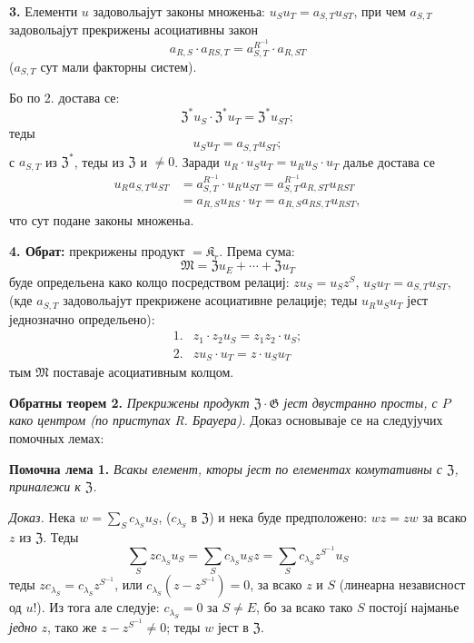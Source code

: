 \documentclass[11pt]{article}
\begin{document}
\noindent\textbf{3.} Елементи \(u\) задовольајут законы множеньа: \(u_Su_T=a_{S,T}u_{ST}\), при чем \(a_{S,T}\) задовольајут прекрижены асоциативны закон
\[
a_{R,S}\cdot a_{RS,T}=a_{S,T}^{R^{-1}}\cdot a_{R,ST}
\]
(\(a_{S,T}\) сут мали факторны систем).

Бо по 2. достава се:
\[
\mathfrak Z^*u_S\cdot\mathfrak Z^*u_T=\mathfrak Z^*u_{ST};
\]
теды
\[
u_Su_T=a_{S,T}u_{ST};
\]
с \(a_{S,T}\) из \(\mathfrak Z^*\), теды из \(\mathfrak Z\) и \(\neq0\). Заради \(u_R\cdot u_Su_T=u_Ru_S\cdot u_T\) далье достава се
\[
\begin{aligned}
u_Ra_{S,T}u_{ST}
&=a_{S,T}^{R^{-1}}\cdot u_Ru_{ST}
 =a_{S,T}^{R^{-1}}a_{R,ST}u_{RST}\\
&=a_{R,S}u_{RS}\cdot u_T
 =a_{R,S}a_{RS,T}u_{RST},
\end{aligned}
\]
что сут подане законы множеньа.

\noindent\textbf{4. Обрат:} прекрижены продукт \(=\mathfrak K_r\). Према сума:
\[
\mathfrak M=\mathfrak Zu_E+\cdots+\mathfrak Zu_T
\]
буде определьена како колцо посредством релациј: \(zu_S=u_Sz^S\), \(u_Su_T=a_{S,T}u_{ST}\), (кде \(a_{S,T}\) задовольајут прекрижене асоциативне релације; теды \(u_Ru_Su_T\) јест једнозначно определьено):
\[
\begin{array}{ll}
1.&z_1\cdot z_2u_S=z_1z_2\cdot u_S;\\[2pt]
2.&zu_S\cdot u_T=z\cdot u_Su_T
\end{array}
\]
тым \(\mathfrak M\) поставаје асоциативным колцом.

\noindent\textbf{Обратны теорем 2.} \emph{Прекрижены продукт \(\mathfrak Z\cdot\mathfrak G\) јест двустранно просты, с \(P\) како центром (по приступах R. Брауера).} Доказ основываје се на следујучих помочных лемах:

\noindent\textbf{Помочна лема 1.} \emph{Всакы елемент, кторы јест по елементах комутативны с \(\mathfrak Z\), приналежи к \(\mathfrak Z\).}

\noindent\emph{Доказ.} Нека \(w=\sum_S c_{\lambda_S}u_S\), (\(c_{\lambda_S}\) в \(\mathfrak Z\)) и нека буде предположено: \(wz=zw\) за всако \(z\) из \(\mathfrak Z\). Теды
\[
\sum_S zc_{\lambda_S}u_S
 =\sum_S c_{\lambda_S}u_Sz
 =\sum_S c_{\lambda_S}z^{S^{-1}}u_S
\]
теды \(zc_{\lambda_S}=c_{\lambda_S}z^{S^{-1}}\), или \(c_{\lambda_S}(z-z^{S^{-1}})=0\), за всако \(z\) и \(S\) (линеарна независност од \(u\)!). Из тога але следује: \(c_{\lambda_S}=0\) за \(S\neq E\), бо за всако тако \(S\) постојí најманье \emph{једно} \(z\), тако же \(z-z^{S^{-1}}\neq0\); теды \(w\) јест в \(\mathfrak Z\).
\end{document}
